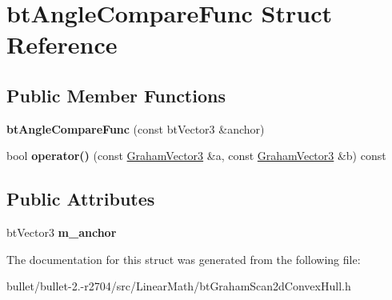 \hypertarget{structbt_angle_compare_func}{\section{bt\+Angle\+Compare\+Func Struct Reference}
\label{structbt_angle_compare_func}
}
\subsection*{Public Member Functions}
\begin{DoxyCompactItemize}
\item 
\hypertarget{structbt_angle_compare_func_ac63930a2d4fa6fb3bf94b33016df1933}{{\bfseries bt\+Angle\+Compare\+Func} (const bt\+Vector3 \&anchor)}\label{structbt_angle_compare_func_ac63930a2d4fa6fb3bf94b33016df1933}

\item 
\hypertarget{structbt_angle_compare_func_abf437120f2eab4c9880ff0a4a26029b5}{bool {\bfseries operator()} (const \hyperlink{struct_graham_vector3}{Graham\+Vector3} \&a, const \hyperlink{struct_graham_vector3}{Graham\+Vector3} \&b) const }\label{structbt_angle_compare_func_abf437120f2eab4c9880ff0a4a26029b5}

\end{DoxyCompactItemize}
\subsection*{Public Attributes}
\begin{DoxyCompactItemize}
\item 
\hypertarget{structbt_angle_compare_func_ad4af6de54547bbc4b8aceb9fc24fcff1}{bt\+Vector3 {\bfseries m\+\_\+anchor}}\label{structbt_angle_compare_func_ad4af6de54547bbc4b8aceb9fc24fcff1}

\end{DoxyCompactItemize}


The documentation for this struct was generated from the following file\+:\begin{DoxyCompactItemize}
\item 
bullet/bullet-\/2.-\/r2704/src/\+Linear\+Math/bt\+Graham\+Scan2d\+Convex\+Hull.\+h\end{DoxyCompactItemize}
